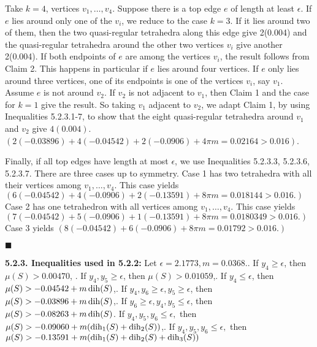 Take $k=4$, vertices $v_1,\dots,v_4$.  Suppose there is a top edge $e$ of length at least $\epsilon$.  If $e$ lies around only one of the $v_i$, we reduce to the case $k=3$.  If it lies around two of them, then the two quasi-regular tetrahedra along this edge give 2(0.004) and the quasi-regular tetrahedra around the other two vertices $v_i$ give another 2(0.004).  If both endpoints of $e$ are among the vertices $v_i$, the result follows from Claim 2.  This happens in particular if $e$ lies around four vertices.  If $e$ only lies around three vertices, one of its endpoints is one of the vertices $v_i$, say $v_1$.  Assume $e$ is not around $v_2$.  If $v_2$ is not adjacent to $v_1$, then Claim 1 and the case for $k=1$ give the result.  So taking $v_1$ adjacent to $v_2$, we adapt Claim 1, by using Inequalities 5.2.3.1-7, to show that the eight quasi-regular tetrahedra around $v_1$ and $v_2$ give $4(0.004)$.  
$(2(-0.03896)+4(-0.04542)+2(-0.0906)+4\pi m = 0.02164 > 0.016)$.

Finally, if all top edges have length at most $\epsilon$, we use Inequalities 5.2.3.3, 5.2.3.6, 5.2.3.7.  
There are three cases up to symmetry.  Case 1 has two tetrahedra with all their vertices among $v_1,\dots,v_4$.  This case yields 
$(6(-0.04542)+4(-0.0906)+2(-0.13591)+8 \pi m = 0.018144 > 0.016.)$  Case 2 has one tetrahedron with all vertices among $v_1,\dots,v_4$.  This case yields 
$(7(-0.04542)+5(-0.0906)+1(-0.13591)+8 \pi m = 0.0180349 > 0.016.)$  Case 3 yields 
$(8(-0.04542)+6(-0.0906)+8 \pi m = 0.01792 > 0.016.)$  

$\blacksquare$

{\bf 5.2.3. Inequalities used in 5.2.2:}
\smallskip
\hbox{}
Let $\epsilon=2.1773, m=0.0368.$.  If $y_4 \geq \epsilon$, then $\mu(S) > 0.00470$, .  If $y_4,y_5 \geq \epsilon$, then $\mu(S) > 0.01059$,.  If $y_4 \leq \epsilon$, then $\mu(S) > -0.04542 + m \operatorname{dih}(S)$,.  If $y_4,y_6 \geq \epsilon, y_5 \geq \epsilon$, then 
	$\mu (S)>-0.03896 + m \operatorname{dih}(S)$,.  If $y_6 \geq \epsilon, y_4,y_5 \leq \epsilon$, then $\mu (S) > -0.08263 + m \operatorname{dih}(S)$.  If $y_4,y_5,y_6\leq\epsilon,$ then $\mu(S) > -0.09060 + m(\operatorname{dih}_1(S)+\operatorname{dih}_2(S))$,.  If $y_4,y_5,y_6 \leq\epsilon,$ then $\mu(S) > -0.13591 + m ( \operatorname{dih}_1(S)+\operatorname{dih}_2(S)+\operatorname{dih}_3(S))$\newline




